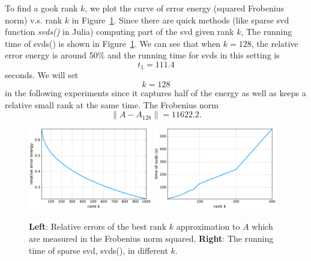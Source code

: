 To find a gook rank $k$,
we plot the curve of error energy (squared Frobenius norm) v.s. rank $k$
in Figure~\ref{fig:rank}.
Since there are quick methods (like sparse svd function \textit{svds()} in Julia)
computing part of the svd given rank $k$,
The running time of svds() is shown in Figure~\ref{fig:rank}.
We can see that when $k=128$,
the relative error energy is around 50\% and
the running time for svds in this setting is
\begin{equation}
    t_1=111.4
\end{equation}
seconds.
We will set
\begin{equation}
    k=128
\end{equation}
in the following experiments since it captures half of the energy
as well as keeps a relative small rank at the same time.
The Frobenius norm
\begin{equation}
	\| A - A_128 \| = 11622.2.
\end{equation}

\begin{figure}[!ht]
	\centering
	\includegraphics[width=0.48\textwidth]{fig/ranks.pdf}
    \hskip 0.2cm
	\includegraphics[width=0.48\textwidth]{fig/ranks_time.pdf}
	\caption{\small
  		\textbf{Left}: Relative errors of the best rank $k$ approximation to $A$
          which are measured in the Frobenius norm squared.
        \textbf{Right}: The running time of sparse svd, svds(), in different $k$.}
	\label{fig:rank}
\end{figure}
